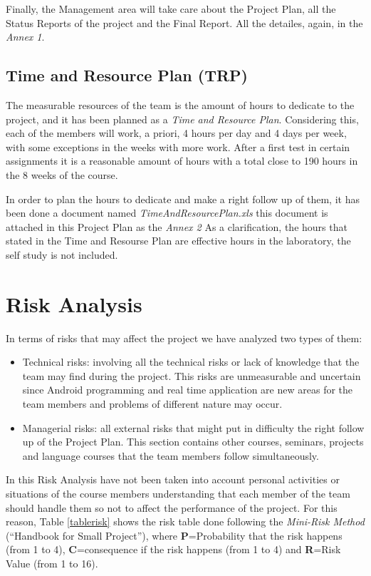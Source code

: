 \documentclass[11pt]{article}
\begin{document}
Finally, the Management area will take care about the Project Plan, all the Status Reports of the project and the Final Report. All the detailes, again, in the \textit{Annex 1}.

\subsection*{Time and Resource Plan (TRP)}
The measurable resources of the team is the amount of hours to dedicate to the project, and it has been planned as a \textit{Time and Resource Plan}. Considering this, each of the members will work, a priori, 4 hours per day and 4 days per week, with some exceptions in the weeks with more work. After a first test in certain assignments it is a reasonable amount of hours with a total close to 190 hours in the 8 weeks of the course.

In order to plan the hours to dedicate and make a right follow up of them, it has been done a document named \textit{TimeAndResourcePlan.xls} this document is attached in this Project Plan as the \textit{Annex 2} As a clarification, the hours that stated in the Time and Resourse Plan are effective hours in the laboratory, the self study is not included.

\section{Risk Analysis}

In terms of risks that may affect the project we have analyzed two types of them:

\begin{itemize}
\item Technical risks: involving all the technical risks or lack of knowledge that the team may find during the project. This risks are unmeasurable and uncertain since Android programming and real time application are new areas for the team members and problems of different nature may occur.

\item Managerial risks: all external risks that might put in difficulty the right follow up of the Project Plan. This section contains other courses, seminars, projects and language courses that the team members follow simultaneously.

\end{itemize}

In this Risk Analysis have not been taken into account personal activities or situations of the course members understanding that each member of the team should handle them so not to affect the performance of the project. For this reason, Table \ref{tablerisk} shows the risk table done following the \textit{Mini-Risk Method} (``Handbook for Small Project''), where \textbf{P}=Probability that the risk happens (from 1 to 4), \textbf{C}=consequence if the risk happens (from 1 to 4) and \textbf{R}=Risk Value (from 1 to 16).
\end{document}
